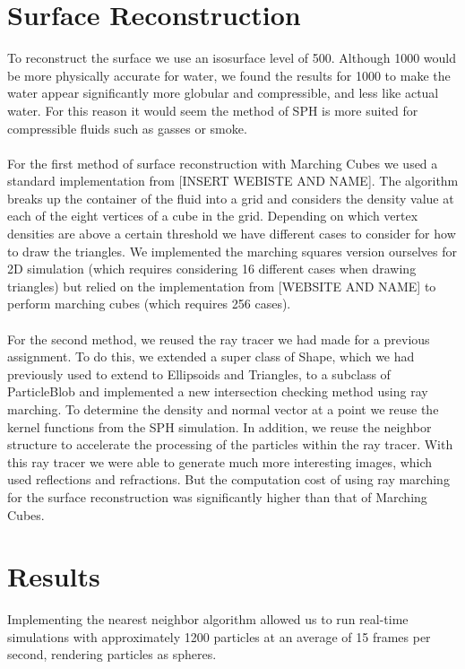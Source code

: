 \documentclass[11pt]{article}
\begin{document}
\section*{Surface Reconstruction}
To reconstruct the surface we use an isosurface level of 500. Although 1000 would be more physically accurate for water, we found the results for 1000 to make the water appear significantly more globular and compressible, and less like actual water. For this reason it would seem the method of SPH is more suited for compressible fluids such as gasses or smoke.
\\
\\
For the first method of surface reconstruction with Marching Cubes we used a standard implementation from [INSERT WEBISTE AND NAME]. The algorithm breaks up the container of the fluid into a grid and considers the density value at each of the eight vertices of a cube in the grid. Depending on which vertex densities are above a certain threshold we have different cases to consider for how to draw the triangles. We implemented the marching squares version ourselves for 2D simulation (which requires considering 16 different cases when drawing triangles) but relied on the implementation from [WEBSITE AND NAME] to perform marching cubes (which requires 256 cases).
\\
\\
For the second method, we reused the ray tracer we had made for a previous assignment. To do this, we extended a super class of Shape, which we had previously used to extend to Ellipsoids and Triangles, to a subclass of ParticleBlob and implemented a new intersection checking method using ray marching. To determine the density and normal vector at a point we reuse the kernel functions from the SPH simulation. In addition, we reuse the neighbor structure to accelerate the processing of the particles within the ray tracer. With this ray tracer we were able to generate much more interesting images, which used reflections and refractions. But the computation cost of using ray marching for the surface reconstruction was significantly higher than that of Marching Cubes.

\section*{Results}
Implementing the nearest neighbor algorithm allowed us to run real-time simulations with approximately 1200 particles at an average of 15 frames per second, rendering particles as spheres. 
\end{document}
